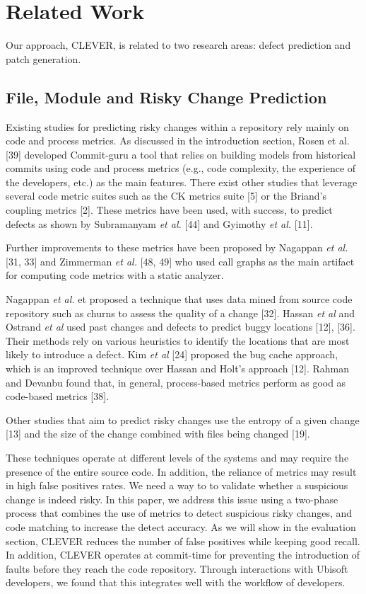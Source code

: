 \documentclass[sigconf]{acmart}
\begin{document}
\section{Related Work}\label{sec:relwork}

Our approach, CLEVER, is related to two research areas: defect
prediction and patch generation.

\subsection{File, Module and Risky Change
Prediction}\label{file-module-and-risky-change-prediction}

Existing studies for predicting risky changes within a repository rely
mainly on code and process metrics. As discussed in the introduction
section, Rosen et al. {[}39{]} developed Commit-guru a tool that relies
on building models from historical commits using code and process
metrics (e.g., code complexity, the experience of the developers, etc.)
as the main features. There exist other studies that leverage several
code metric suites such as the CK metrics suite {[}5{]} or the Briand's
coupling metrics {[}2{]}. These metrics have been used, with success, to
predict defects as shown by Subramanyam \emph{et al.} {[}44{]} and
Gyimothy \emph{et al.} {[}11{]}.

Further improvements to these metrics have been proposed by Nagappan
\emph{et al.} {[}31, 33{]} and Zimmerman \emph{et al.} {[}48, 49{]} who
used call graphs as the main artifact for computing code metrics with a
static analyzer.

Nagappan \emph{et al.} et proposed a technique that uses data mined from
source code repository such as churns to assess the quality of a change
{[}32{]}. Hassan \emph{et al} and Ostrand \emph{et al} used past changes
and defects to predict buggy locations {[}12{]}, {[}36{]}. Their methods
rely on various heuristics to identify the locations that are most
likely to introduce a defect. Kim \emph{et al} {[}24{]} proposed the bug
cache approach, which is an improved technique over Hassan and Holt's
approach {[}12{]}. Rahman and Devanbu found that, in general,
process-based metrics perform as good as code-based metrics {[}38{]}.

Other studies that aim to predict risky changes use the entropy of a
given change {[}13{]} and the size of the change combined with files
being changed {[}19{]}.

These techniques operate at different levels of the systems and may
require the presence of the entire source code. In addition, the
reliance of metrics may result in high false positives rates. We need a
way to to validate whether a suspicious change is indeed risky. In this
paper, we address this issue using a two-phase process that combines the
use of metrics to detect suspicious risky changes, and code matching to
increase the detect accuracy. As we will show in the evaluation section,
CLEVER reduces the number of false positives while keeping good recall.
In addition, CLEVER operates at commit-time for preventing the
introduction of faults before they reach the code repository. Through
interactions with Ubisoft developers, we found that this integrates well
with the workflow of developers.
\end{document}
